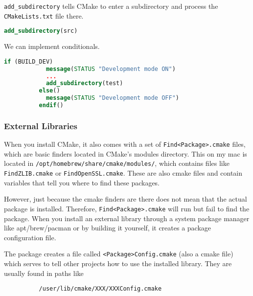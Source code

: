 \documentclass{article}
\begin{document}
      \begin{definition}[Subdirectories]
        \texttt{add\_subdirectory} tells CMake to enter a subdirectory and process the \texttt{CMakeLists.txt} file there. 
        \begin{lstlisting}[language=CMake]
          add_subdirectory(src)
        \end{lstlisting}
      \end{definition}

      \begin{definition}[Conditionals]
        We can implement conditionals. 
        \begin{lstlisting}[language=CMake]
          if (BUILD_DEV) 
            message(STATUS "Development mode ON")
            ...
            add_subdirectory(test)
          else()
            message(STATUS "Development mode OFF")
          endif()
        \end{lstlisting}
      \end{definition}
    
    \subsubsection{External Libraries} 

      When you install CMake, it also comes with a set of \texttt{Find<Package>.cmake} files, which are basic finders located in CMake's modules directory. This on my mac is located in \texttt{/opt/homebrew/share/cmake/modules/}, which contains files like \texttt{FindZLIB.cmake} or \texttt{FindOpenSSL.cmake}. These are also cmake files and contain variables that tell you where to find these packages. 

      However, just because the cmake finders are there does not mean that the actual package is installed. Therefore, \texttt{Find<Package>.cmake} will run but fail to find the package. When you install an external library through a system package manager like apt/brew/pacman or by building it yourself, it creates a package configuration file. 

      \begin{definition}
        The package creates a file called \texttt{<Package>Config.cmake} (also a cmake file) which serves to tell other projects how to use the installed library. They are usually found in paths like 
        \begin{lstlisting}
          /user/lib/cmake/XXX/XXXConfig.cmake
        \end{lstlisting}
      \end{definition}
\end{document}
